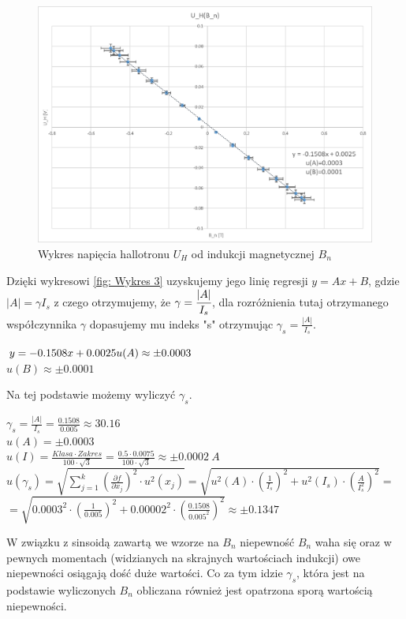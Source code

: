 \documentclass{article}
\begin{document}
\begin{figure}[h]
    \centering
    \includegraphics{U_H_od_B_n.png}
    \caption{Wykres napięcia hallotronu $U_{H}$ od indukcji magnetycznej $B_{n}$ }
    \label{fig:rys3}
\end{figure}{}
Dzięki wykresowi \ref{fig: Wykres 3} uzyskujemy jego linię regresji $y=Ax+B$, gdzie $|A|=\gamma I_{s}$ z czego otrzymujemy, że $\gamma=\cfrac{|A|}{I_{s}}$, dla rozróżnienia tutaj otrzymanego współczynnika $\gamma$ dopasujemy mu indeks "s" otrzymując $\gamma_{s}=\frac{|A|}{I_{s}}$.
\begin{center}
    $y=-0.1508x+0.0025\\
    u(A)\approx\pm0.0003$\\
    $u(B)\approx\pm0.0001$
\end{center}{}
\newpage
Na tej podstawie możemy wyliczyć $\gamma_{s}$.
\begin{center}
    \vspace{2.5ex}
    $\gamma_{s}=\frac{|A|}{I_{s}}=\frac{0.1508}{0.005}\approx30.16$\\
    \vspace{2.5ex}
    $u(A)=\pm0.0003$\\
    \vspace{2.5ex}
    $u(I)=\frac{Klasa\cdot Zakres}{100\cdot \sqrt{3}}=\frac{0.5\cdot0.0075}{100\cdot \sqrt{3}}\approx\pm0.0002 \ A$\\
    \vspace{2.5ex}
    $u(\gamma_{s})=\sqrt{\sum^{k}_{j=1}\left(\frac{\partial f}{\partial x_{j}}\right)^{2}\cdot u^{2}(x_{j})}=\sqrt{u^{2}(A)\cdot\left(\frac{1}{I_{s}}\right)^{2}+u^{2}(I_{s})\cdot(\frac{A}{I_{s}^{2}})^{2}}=$\\
    \vspace{2.5ex}
    $=\sqrt{0.0003^{2}\cdot\left(\frac{1}{0.005}\right)^{2}+0.00002^{2}\cdot(\frac{0.1508}{0.005^{2}})^{2}}  \approx\pm0.1347$\\
    \vspace{2.5ex}
\end{center}
W związku z sinsoidą zawartą we wzorze na $B_{n}$ niepewność $B_{n}$ waha się oraz w pewnych momentach (widzianych na skrajnych wartościach indukcji) owe niepewności osiągają dość duże wartości. Co za tym idzie $\gamma_{s}$, która jest na podstawie wyliczonych $B_{n}$ obliczana również jest opatrzona sporą wartością niepewności.\\
\end{document}
